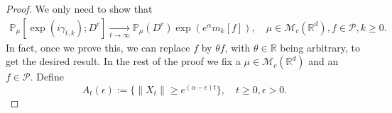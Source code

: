 \documentclass[12pt,a4paper]{amsart}
\theoremstyle{plain}
\theoremstyle{definition}
\numberwithin{equation}{section}
\begin{document}
 \begin{proof}
    We only need to show that
\begin{equation}\begin{split}
    \mathbb{P}_{\mu}[\exp(i\gamma_{t,k}); D^c]
    \xrightarrow[t\rightarrow \infty]{}\mathbb{P}_{\mu}(D^c)\exp(e^{\alpha}m_k[f]),
    \quad \mu \in \mathcal M_c(\mathbb R^d), f\in \mathcal P, k \geq 0.
\end{split}\end{equation}
    In fact, once we prove this, we can replace $f$ by $\theta f$, with $\theta \in \mathbb R$ being  arbitrary,  to get the desired result.
    In the rest of the proof we fix a $\mu \in \mathcal M_c(\mathbb R^d)$ and an $f\in \mathcal P$.
    Define
\[
    A_t(\epsilon):=\{ \|X_t\| \geq e^{(\alpha - \epsilon)t} \},\quad t\geq 0, \epsilon > 0.
\]
    

\end{proof}
\end{document}
